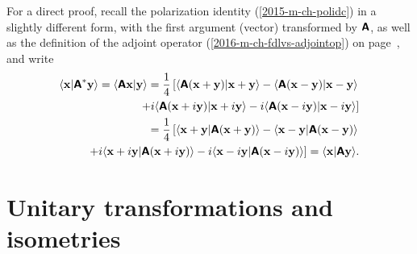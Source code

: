 {\color{OliveGreen}\bproof
For a direct proof,
recall the
polarization identity
(\ref{2015-m-ch-polidc})  in a slightly different form, with the first argument (vector) transformed by $\textsf{\textbf{A}}$,
as well as the definition of the adjoint operator (\ref{2016-m-ch-fdlvs-adjointop})
on page~\pageref{2016-m-ch-fdlvs-adjointop},
and write
\begin{equation}
\begin{split}
\langle {\bf x}\vert \textsf{\textbf{A}}^\ast {\bf y}\rangle
=
\langle \textsf{\textbf{A}} {\bf x}\vert {\bf y}\rangle
=
\frac{1}{4}\left[
\langle \textsf{\textbf{A}} ({\bf x}+ {\bf y}) \vert {\bf x}+ {\bf y}\rangle
-
\langle \textsf{\textbf{A}}({\bf x}- {\bf y}) \vert {\bf x}- {\bf y}\rangle \right.  \\
\left.
+ i
\langle \textsf{\textbf{A}} ({\bf x}+ i{\bf y}) \vert {\bf x}+ i{\bf y}\rangle
- i
\langle \textsf{\textbf{A}} ({\bf x}- i{\bf y}) \vert {\bf x} -i {\bf y}\rangle
\right]
\\
=
\frac{1}{4}\left[
\langle {\bf x}+ {\bf y} \vert \textsf{\textbf{A}} ({\bf x}+ {\bf y})\rangle
-
\langle {\bf x}- {\bf y} \vert \textsf{\textbf{A}}({\bf x}- {\bf y})\rangle \right.  \\
\left.
+ i
\langle {\bf x}+ i{\bf y} \vert \textsf{\textbf{A}} ({\bf x}+ i{\bf y})\rangle
- i
\langle {\bf x}- i{\bf y} \vert \textsf{\textbf{A}} ({\bf x} -i {\bf y})\rangle
\right]
=
\langle {\bf x}\vert \textsf{\textbf{A}}{\bf y}\rangle
.
\end{split}
\label{2015-m-ch-polidrv}
\end{equation}
\eproof
}




\section{Unitary transformations and isometries}
\label{2014-m-ch-fdvs-unitary}


